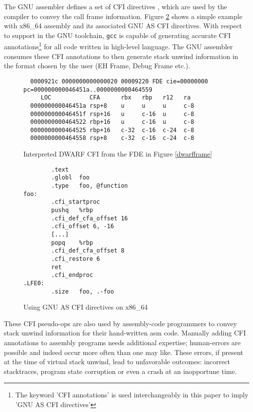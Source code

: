 \documentclass{article} \usepackage[a4paper, total={6in, 8in}]{geometry}
\begin{document}
The GNU assembler defines a set of CFI directives \cite{CFIPSEUDO}, which are
used by the compiler to convey the call frame information.  Figure
\ref{gnuascfidirectives} shows a simple example with x86\_64 assembly and its
associated GNU AS CFI directives. With respect to support in the GNU toolchain,
\texttt{gcc} is capable of generating accurate CFI annotations\footnote{The
keyword 'CFI annotations' is used interchangeably in this paper to imply
'GNU AS CFI directives'} for all code written in high-level language.
The GNU assembler consumes these CFI annotations to then generate
stack unwind information in the format chosen by the user (EH Frame, Debug Frame etc.).

\begin{figure}
\begin{verbatim}
  0000921c 0000000000000020 00009220 FDE cie=00000000 pc=000000000046451a..0000000000464559
     LOC           CFA      rbx   rbp   r12   ra
  000000000046451a rsp+8    u     u     u     c-8
  000000000046451f rsp+16   u     c-16  u     c-8
  0000000000464522 rbp+16   u     c-16  u     c-8
  0000000000464525 rbp+16   c-32  c-16  c-24  c-8
  0000000000464558 rsp+8    c-32  c-16  c-24  c-8
  \end{verbatim}
  \caption{Interpreted DWARF CFI from the FDE in Figure \ref{dwarfframe}}
  \label{interpframe}
\end{figure}

\begin{figure}
\begin{verbatim}
        .text
        .globl  foo
        .type   foo, @function
foo:
        .cfi_startproc
        pushq   %rbp
        .cfi_def_cfa_offset 16
        .cfi_offset 6, -16
        [...]
        popq    %rbp
        .cfi_def_cfa_offset 8
        .cfi_restore 6
        ret
        .cfi_endproc
.LFE0:
        .size   foo, .-foo
  \end{verbatim}
  \caption{Using GNU AS CFI directives on x86\_64}
  \label{gnuascfidirectives}
\end{figure}

These CFI pseudo-ops are also used by assembly-code programmers to convey stack
unwind information for their hand-written asm code.  Manually adding CFI
annotations to assembly programs needs additional expertise; human-errors are
possible and indeed occur more often than one may like.  These errors, if
present at the time of virtual stack unwind, lead to unfavorable outcomes:
incorrect stacktraces, program state corruption or even a crash at an
inopportune time.
\end{document}
